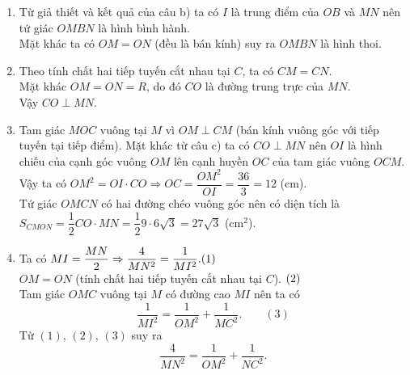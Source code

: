 \begin{vd}
{\begin{enumerate}
			Vì $OB\perp MN$ tại $I$ nên $I$ cũng là trung điểm của $MN$.\\
			Vậy $MN=2MI=6\sqrt{3}$ (cm).
			\item Từ giả thiết và kết quả của câu b) ta có $I$ là trung điểm của $OB$ và $MN$ nên tứ giác $OMBN$ là hình bình hành.\\
			Mặt khác ta có $OM=ON$ (đều là bán kính) suy ra $OMBN$ là hình thoi.
			\item Theo tính chất hai tiếp tuyến cắt nhau tại $C$,
			ta có $CM = CN$.\\
			Mặt khác $OM = ON = R$, do đó $CO$ là đường trung trực của $MN$.\\
			Vậy $CO \perp MN$.
			\item Tam giác $MOC$ vuông tại $M$ vì $OM\perp CM$ (bán kính vuông góc với tiếp tuyến tại tiếp điểm). Mặt khác từ câu c) ta có $CO\perp MN$ nên $OI$ là hình chiếu của cạnh góc vuông $OM$ lên cạnh huyền $OC$ của tam giác vuông $OCM$.\\
			Vậy ta có $OM^2=OI\cdot CO\Rightarrow OC=\dfrac{OM^2}{OI}=\dfrac{36}{3}=12$ (cm).\\
			Tứ giác $OMCN$ có hai đường chéo vuông góc nên có diện tích là\\
			${S}_{CMON}=\dfrac{1}{2}CO\cdot MN=\dfrac{1}{2}9\cdot 6\sqrt{3}=27\sqrt{3}$ (cm$^2$).
			\item Ta có $MI=\dfrac{MN}{2}\Rightarrow \dfrac{4}{MN^2}=\dfrac{1}{MI^2}.\hfill (1)$\\
			$OM=ON$ (tính chất hai tiếp tuyến cắt nhau tại $C$). $\hfill (2)$\\
			Tam giác $OMC$ vuông tại $M$ có đường cao $MI$ nên ta có 
			$$\dfrac{1}{MI^2}=\dfrac{1}{OM^2}+\dfrac{1}{MC^2}.\qquad (3)$$
			Từ $(1)$, $(2)$, $(3)$ suy ra  $$\dfrac{4}{MN^2}=\dfrac{1}{OM^2}+\dfrac{1}{NC^2}.$$ 
		\end{enumerate}
		
	}
\end{vd}

